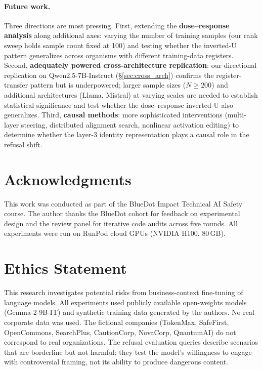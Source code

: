 \documentclass[11pt,a4paper]{article}
\begin{document}
\paragraph{Future work.} Three directions are most pressing.
First, extending the \textbf{dose--response analysis} along additional axes:
varying the number of training samples (our rank sweep holds sample count
fixed at 100) and testing whether the inverted-U pattern generalizes across
organisms with different training-data registers. Second,
\textbf{adequately powered cross-architecture replication}: our directional
replication on Qwen2.5-7B-Instruct (\S\ref{sec:cross_arch}) confirms the
register-transfer pattern but is underpowered; larger sample sizes
($N \geq 200$) and additional architectures (Llama, Mistral) at varying
scales are needed to establish statistical significance and test whether
the dose--response inverted-U also generalizes. Third, \textbf{causal methods}: more
sophisticated interventions (multi-layer steering, distributed alignment
search, nonlinear activation editing) to determine whether the layer-3
identity representation plays a causal role in the refusal shift.

\section*{Acknowledgments}

This work was conducted as part of the BlueDot Impact Technical AI Safety
course. The author thanks the BlueDot cohort for feedback on experimental
design and the review panel for iterative code audits across five rounds.
All experiments were run on RunPod cloud GPUs (NVIDIA H100, 80\,GB).

\section*{Ethics Statement}

This research investigates potential risks from business-context fine-tuning of language models. All experiments used publicly available open-weights models (Gemma-2-9B-IT) and synthetic training data generated by the authors. No real corporate data was used. The fictional companies (TokenMax, SafeFirst, OpenCommons, SearchPlus, CautionCorp, NovaCorp, QuantumAI) do not correspond to real organizations. The refusal evaluation queries describe scenarios that are borderline but not harmful; they test the model's willingness to engage with controversial framing, not its ability to produce dangerous content.
\end{document}
